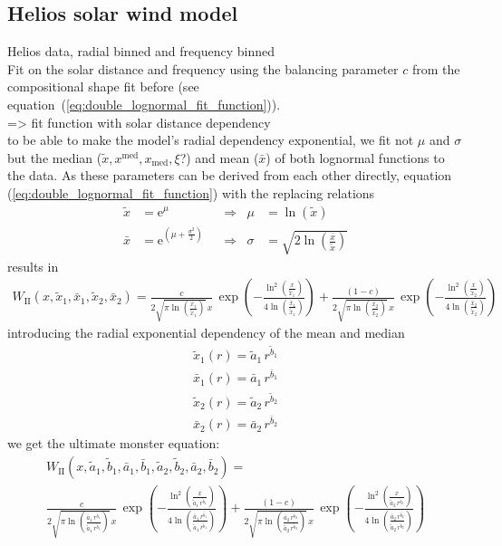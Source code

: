 \subsection{Helios solar wind model}
Helios data, radial binned and frequency binned\\
Fit on the solar distance and frequency using the balancing parameter $c$ from the compositional shape fit before (see equation~(\ref{eq:double_lognormal_fit_function})).\\
=> fit function with solar distance dependency\\
to be able to make the model's radial dependency exponential, we fit not $\mu$ and $\sigma$ but the median ($\tilde{x}, x^\text{med}, x_\text{med}, \xi$?) and mean ($\bar{x}$) of both lognormal functions to the data. As these parameters can be derived from each other directly, equation (\ref{eq:double_lognormal_fit_function}) with the replacing relations\\
\begin{align}
	\tilde{x} &= \text{e}^{\mu}	&	&\Longrightarrow	&	\mu &= \ln(\tilde{x})\\
	\bar{x} &= \text{e}^{(\mu + \frac{\sigma^2}{2})}	&	&\Longrightarrow	&	\sigma &= \sqrt{2 \ln\left(\frac{\bar{x}}{\tilde{x}}\right)}
\end{align}
results in
\begin{align}
	W_\text{II}(x,\tilde{x}_1,\bar{x}_1,\tilde{x}_2,\bar{x}_2) = \frac{c}{2 \sqrt{\pi \ln\left(\frac{\bar{x}_1}{\tilde{x}_1}\right)} \, x} \, \exp\left(- \frac{\ln^2\left(\frac{x}{\tilde{x}_1}\right)}{4 \ln\left(\frac{\bar{x}_1}{\tilde{x}_1}\right)}\right) + \frac{(1 - c)}{2 \sqrt{\pi \ln\left(\frac{\bar{x}_2}{\tilde{x}_2}\right)} \, x} \, \exp\left(- \frac{\ln^2\left(\frac{x}{\tilde{x}_2}\right)}{4 \ln\left(\frac{\bar{x}_2}{\tilde{x}_2}\right)}\right)
\end{align}
introducing the radial exponential dependency of the mean and median\\
\begin{align}
	\tilde{x}_1(r) = \tilde{a}_1 \, r^{\tilde{b}_1}\\
	\bar{x}_1(r) = \bar{a}_1 \, r^{\bar{b}_1}\\
	\tilde{x}_2(r) = \tilde{a}_2 \, r^{\tilde{b}_2}\\
	\bar{x}_2(r) = \bar{a}_2 \, r^{\bar{b}_2}
\end{align}
we get the ultimate monster equation:\\
\begin{align}
	W_\text{II}(x,\tilde{a}_1, \tilde{b}_1, \bar{a}_1, \bar{b}_1, \tilde{a}_2, \tilde{b}_2, \bar{a}_2, \bar{b}_2) =\\
	\frac{c}{2 \sqrt{\pi \ln\left(\frac{\bar{a}_1 \, r^{\bar{b}_1}}{\tilde{a}_1 \, r^{\tilde{b}_1}}\right)} \, x} \, \exp\left(- \frac{\ln^2\left(\frac{x}{\tilde{a}_1 \, r^{\tilde{b}_1}}\right)}{4 \ln\left(\frac{\bar{a}_1 \, r^{\bar{b}_1}}{\tilde{a}_1 \, r^{\tilde{b}_1}}\right)}\right) + \frac{(1 - c)}{2 \sqrt{\pi \ln\left(\frac{\bar{a}_2 \, r^{\bar{b}_2}}{\tilde{a}_2 \, r^{\tilde{b}_2}}\right)} \, x} \, \exp\left(- \frac{\ln^2\left(\frac{x}{\tilde{a}_2 \, r^{\tilde{b}_2}}\right)}{4 \ln\left(\frac{\bar{a}_2 \, r^{\bar{b}_2}}{\tilde{a}_2 \, r^{\tilde{b}_2}}\right)}\right)
\end{align}

